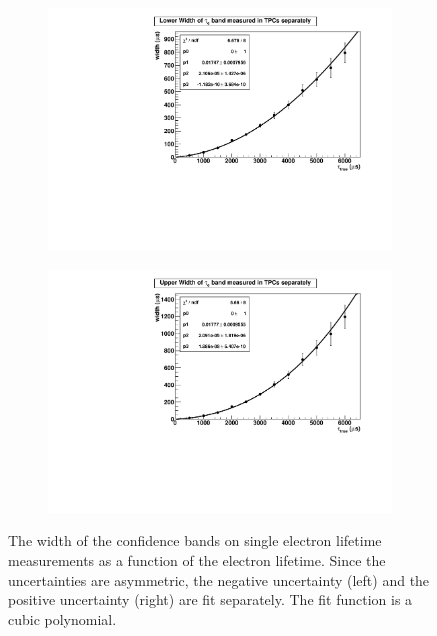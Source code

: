 \documentclass[herrin-thesis.tex]{subfiles}
\begin{document}
\begin{figure}[tbp]
\begin{subfigure}[b]{0.5\linewidth}
\centering
\includegraphics[width=1.0\columnwidth]{./plots/el_sim_errm_fit.pdf}
\end{subfigure}%
\begin{subfigure}[b]{0.5\linewidth}
\centering
\includegraphics[width=1.0\columnwidth]{./plots/el_sim_errp_fit.pdf}
\end{subfigure}
\caption[Fits to confidence band widths for electron lifetime measurements]{The width of the confidence bands on single electron lifetime measurements as a function of the electron lifetime. Since the uncertainties  are asymmetric, the negative uncertainty (left) and the positive uncertainty (right) are fit separately. The fit function is a cubic polynomial.}
\label{fig:el_err_fits}
\end{figure}
\end{document}

